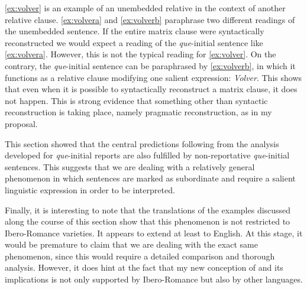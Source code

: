 \eqref{ex:volver} is an example of an unembedded relative in the context of another relative clause. \eqref{ex:volvera}
and \eqref{ex:volverb} paraphrase two different readings of the unembedded sentence. If the entire matrix
clause were syntactically reconstructed we would expect a reading of the \emph{que}-initial
sentence  like \eqref{ex:volvera}. However, this is not the typical reading  for \eqref{ex:volver}. On the contrary, the \emph{que}-initial sentence can be paraphrased by \eqref{ex:volverb}, in which it functions as a relative clause modifying
one salient expression: \emph{Volver}. This shows that even  when it is possible to
syntactically reconstruct a matrix clause, it does not happen. This is  strong evidence that
something other than syntactic reconstruction is taking place, namely pragmatic reconstruction, as  in my proposal.


This section showed that the central predictions following from the analysis developed for \emph{que}-initial reports are also fulfilled by non-reportative \emph{que}-initial sentences. This suggests
that we are dealing with a relatively general phenomenon in which sentences  are marked
as subordinate and require a salient linguistic expression in order to be interpreted. 

Finally, it is interesting to note that  the translations of the examples discussed along the course of this section show that this phenomenon is not restricted to Ibero-Romance varieties. It appears to extend at least to English. At this stage, it would be premature  to claim  that we are dealing with the exact same phenomenon, since this would require a detailed comparison and thorough analysis. However,  it does hint at the fact that my new conception of  and its implications is not only supported by Ibero-Romance but also by other languages.   

